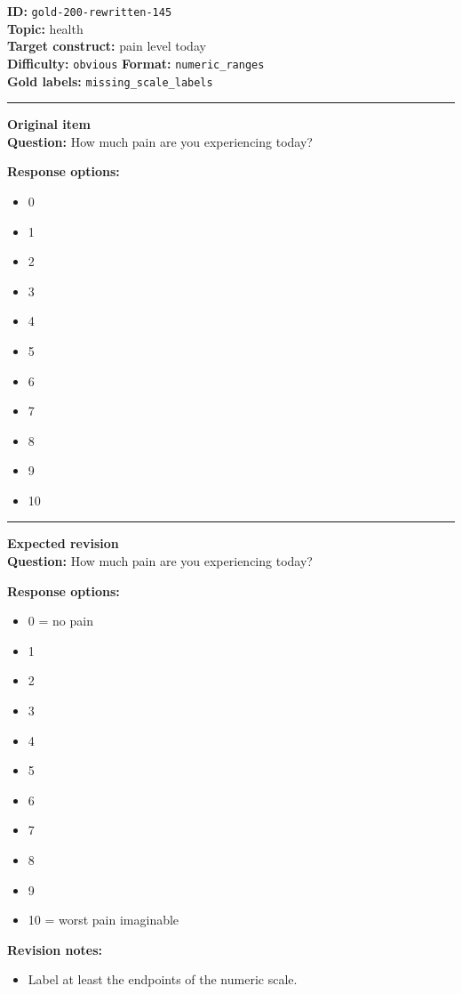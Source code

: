 \documentclass[10pt,a4paper]{article}
\newcommand{\sectionline}{\vspace{0.15em}\hrule\vspace{0.35em}}
\begin{document}
\begin{tcolorbox}[colframe=FlawRed,colback=white,colbacktitle=FlawRed!9,coltitle=black,title={Item 145\hfill Flawed item}]
\textbf{ID:} \texttt{gold-200-rewritten-145}\\
\textbf{Topic:} health\\
\textbf{Target construct:} pain level today\\
\textbf{Difficulty:} \texttt{obvious} \quad \textbf{Format:} \texttt{numeric\_ranges}\\
\textbf{Gold labels:} \texttt{missing\_scale\_labels}\\
\sectionline
\textbf{Original item}\\
\textbf{Question:} How much pain are you experiencing today?
\par\textbf{Response options:}
\begin{itemize}
\item 0
\item 1
\item 2
\item 3
\item 4
\item 5
\item 6
\item 7
\item 8
\item 9
\item 10
\end{itemize}
\sectionline
\textbf{Expected revision}\\
\textbf{Question:} How much pain are you experiencing today?
\par\textbf{Response options:}
\begin{itemize}
\item 0 = no pain
\item 1
\item 2
\item 3
\item 4
\item 5
\item 6
\item 7
\item 8
\item 9
\item 10 = worst pain imaginable
\end{itemize}
\par\textbf{Revision notes:}
\begin{itemize}
\item Label at least the endpoints of the numeric scale.
\end{itemize}
\end{tcolorbox}
\end{document}
